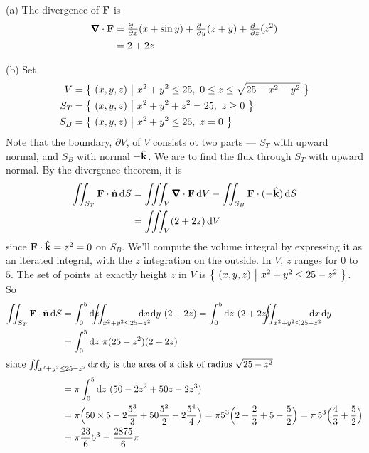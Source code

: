 \begin{solution} (a)
The divergence of $\mathbf{F}$ is
\begin{align*}
\vnabla\cdot\vF 
&= \tfrac{\partial\hfill}{\partial x}(x+\sin y)
  +\tfrac{\partial\hfill}{\partial y}(z+y)
  +\tfrac{\partial\hfill}{\partial z}(z^2) \\
&=2+2z
\end{align*}

\noindent (b) Set
\begin{align*}
V &= \big\{ \ (x,y,z)\ \big|\ x^2+y^2\le 25,\ 0\le z\le \sqrt{25-x^2-y^2}\ \big\} \\
S_T &= \big\{ \ (x,y,z)\ \big|\ x^2+y^2+z^2 = 25,\ z\ge 0\ \big\} \\
S_B &= \big\{ \ (x,y,z)\ \big|\ x^2+y^2 \le 25,\ z= 0\ \big\} 
\end{align*}
Note that the boundary, $\partial V$, of $V$ consists ot two parts ---
$S_T$ with upward normal, and $S_B$ with normal $-\hat{\mathbf{k}}$.
We are to find the flux through $S_T$ with upward normal. By the 
divergence theorem, it is
\begin{align*}
\dblInt_{S_T} \vF\cdot\hn\,\dee{S}
&=\tripInt_V \vnabla\cdot\vF\,\dee{V} 
     - \dblInt_{S_B} \vF\cdot(-\hk)\,\dee{S} \\
&= \tripInt_V (2+2z)\,\dee{V}  
\end{align*} 
since $\mathbf{F}\cdot\hat{\mathbf{k}}=z^2=0$ on $S_B$. We'll compute the volume integral by expressing it as an iterated integral, with the $z$ integration on the 
outside. In $V$, $z$ ranges for $0$ to $5$. The set of points 
at exactly height $z$ in $V$ is  $\big\{ \ (x,y,z)\ \big|\ x^2+y^2\le 25-z^2\ \big\}$. 
So
\begin{align*}
\dblInt_{S_T} \vF\cdot\hn\,\dee{S}
&= \int_0^5\dee{z}\hskip-10pt \dblInt_{x^2+y^2\le 25-z^2}\hskip-15pt 
            \dee{x}\,\dee{y}\  (2+2z)
= \int_0^5\dee{z}\ (2+2z)\hskip-10pt\dblInt_{x^2+y^2\le 25-z^2}\hskip-15pt 
\dee{x}\,\dee{y} \\
&= \int_0^5\dee{z}\ \pi(25-z^2) (2+2z) \\
\intertext{since $\dblInt_{x^2+y^2\le 25-z^2} \dee{x}\,\dee{y}$
is the area of a disk of radius $\sqrt{25-z^2}$}
&= \pi\int_0^5\dee{z}\ (50 -2z^2 +50z -2z^3) \\
&=\pi\Big(50\times 5-2\frac{5^3}{3} +50\frac{5^2}{2}-2\frac{5^4}{4}\Big)
=\pi 5^3 \Big(2-\frac{2}{3} +5-\frac{5}{2}\Big) 
= \pi\,5^3 \Big(\frac{4}{3}+\frac{5}{2}\Big) \\
&=\pi\frac{23}{6} 5^3
=\frac{2875}{6}\pi
\end{align*}


\end{solution}
